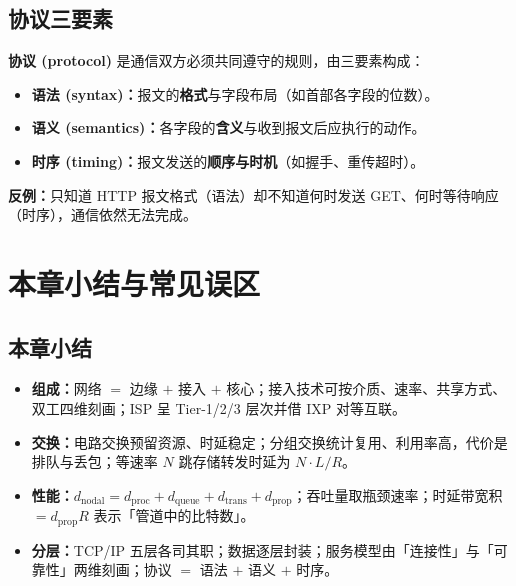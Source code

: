 \subsection{协议三要素}
\textbf{协议 (protocol)} 是通信双方必须共同遵守的规则，由三要素构成：
\begin{itemize}
    \item \textbf{语法 (syntax)：}报文的\textbf{格式}与字段布局（如首部各字段的位数）。
    \item \textbf{语义 (semantics)：}各字段的\textbf{含义}与收到报文后应执行的动作。
    \item \textbf{时序 (timing)：}报文发送的\textbf{顺序与时机}（如握手、重传超时）。
\end{itemize}
\textbf{反例：}只知道 HTTP 报文格式（语法）却不知道何时发送 GET、何时等待响应（时序），通信依然无法完成。

\section{本章小结与常见误区}

\subsection{本章小结}
\begin{itemize}
    \item \textbf{组成：}网络 $=$ 边缘 $+$ 接入 $+$ 核心；接入技术可按介质、速率、共享方式、双工四维刻画；ISP 呈 Tier-1/2/3 层次并借 IXP 对等互联。
    \item \textbf{交换：}电路交换预留资源、时延稳定；分组交换统计复用、利用率高，代价是排队与丢包；等速率 $N$ 跳存储转发时延为 $N\cdot L/R$。
    \item \textbf{性能：}$d_{\text{nodal}} = d_{\text{proc}} + d_{\text{queue}} + d_{\text{trans}} + d_{\text{prop}}$；吞吐量取瓶颈速率；时延带宽积 $=d_{\text{prop}}R$ 表示「管道中的比特数」。
    \item \textbf{分层：}TCP/IP 五层各司其职；数据逐层封装；服务模型由「连接性」与「可靠性」两维刻画；协议 $=$ 语法 $+$ 语义 $+$ 时序。
\end{itemize}

